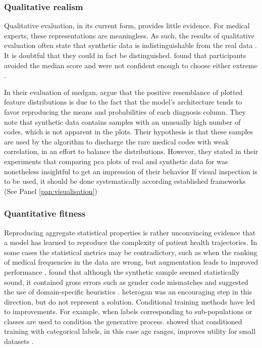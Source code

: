 \subsubsection{Qualitative realism}
Qualitative evaluation, in its current form, provides little evidence. For medical experts, these representations are meaningless. As such, the results of qualitative evaluation often state that synthetic data is indistinguishable from the real data \cite{Choi2017-nt,Wang_2019}. It is doubtful that they could in fact be distinguished. \citeauthor{esteban2017real} found that participants avoided the median score and were not confident enough to choose either extreme \cite{esteban2017real}.\par

%
%

In their evaluation of \gls{medgan}, \cite{yale:hal-02160496} argue that the positive resemblance of plotted feature distributions is due to the fact that the model's architecture tends to favor reproducing the means and probabilities of each diagnosis column. They note that synthetic data contains samples with an unusually high number of codes, which is not apparent in the plots. Their hypothesis is that these samples are used by the algorithm to discharge the rare medical codes with weak correlation, in an effort to balance the distributions. However, they stated in their experiments that comparing \gls{pca} plots of real and synthetic data for was nonetheless insightful to get an impression of their behavior \cite{Yale_2020} If visual inspection is to be used, it should be done systematically according established frameworks (See Panel \ref{pan:visualisation})\par

\subsubsection{Quantitative fitness}
Reproducing aggregate statistical properties is rather unconvincing evidence that a model has learned to reproduce the complexity of patient health trajectories. In some cases the statistical metrics may be contradictory, such as when the ranking of medical frequencies in the data are wrong, but augmentation leads to improved performance \cite{Che_2017}. \citeauthor{Choi2017-nt} found that although the synthetic sample seemed statistically sound, it contained gross errors such as gender code mismatches and suggested the use of domain-specific heuristics \cite{Choi2017-nt}. \gls{heterogan} was an encouraging step in this direction, but do not represent a solution. Conditional training methods have led to improvements. For example, when labels corresponding to sub-populations or classes are used to condition the generative process. \citeauthor{Zhang2020} showed that conditioned training with categorical labels, in this case age ranges, improves utility for small datasets \cite{Zhang2020}. \par


